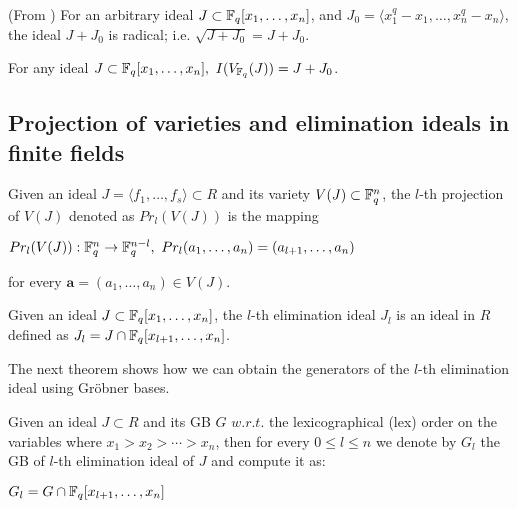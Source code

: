 \begin{Lemma}
\label{lemma:radical-ff}
(From \cite{gao:qe-gf-gb}) For an arbitrary ideal $J\subset
{\mathbb{F}}_{q}[x_1,\dots,x_n]$, and  $J_0 = \langle
x_1^q-x_1,\dots,x_n^q-x_n\rangle$, the ideal $J + J_0$ is radical; 
i.e. $\sqrt{J+J_0} = J+J_0$. 
\end{Lemma}


\begin{Theorem} \label{thm:strong-ns}  
For any ideal $J \subset {\mathbb{F}}_{q}[x_1,\dots,x_n], ~I(V_{{\mathbb{F}}_{q}}(J)) = J + J_0$.
\end{Theorem}


\subsection{Projection of varieties and elimination ideals in finite
  fields} 

\begin{Definition}
Given an ideal $J = \langle f_1,\dots, f_s \rangle \subset R$ and its
variety $V(J) \subset {\mathbb{F}}_{q}^n$,  
the $l$-th projection of $V(J)$ denoted as $Pr_l(V(J))$ is the mapping
\begin{center}
$Pr_l(V(J)):{\mathbb{F}}_{q}^n \rightarrow {\mathbb{F}}_{q}^{n-l}, ~Pr_l(a_1,\dots,a_n) = (a_{l+1},\dots,a_n) $
\end{center}
for every $\bm{a} = (a_1,\dots,a_n) \in V(J)$.
\end{Definition}

\begin{Definition}
Given an ideal $J \subset {\mathbb{F}}_{q}[x_1,\dots,x_n]$, the $l$-th elimination
ideal $J_l$ is an ideal in $R$ defined as $J_l = J \cap {\mathbb{F}}_{q}[x_{l+1},\dots,x_n]$.
\end{Definition}

The next theorem shows how we can obtain the generators of the $l$-th
elimination ideal using Gr\"obner bases.

\begin{Theorem}
Given an ideal $J \subset R$ and its GB $G$ $w.r.t.$ the
lexicographical (lex) order on the variables 
where $x_1 > x_2 > \cdots > x_n$, then for every $0 \leq l \leq n$ we
denote by $G_l$ the GB of $l$-th elimination ideal of $J$ and compute it as:
\begin{center}
$G_l = G \cap {\mathbb{F}}_{q}[x_{l+1},\dots,x_n]$
\end{center}
\end{Theorem}

